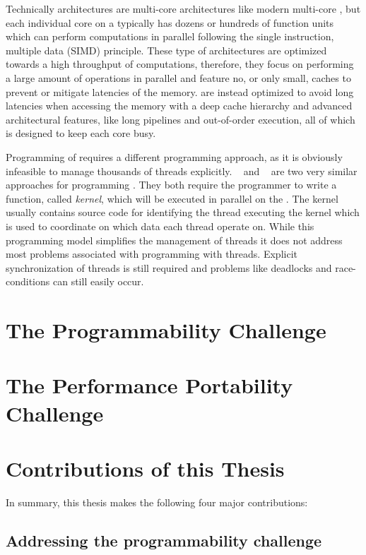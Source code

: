 Technically \GPU architectures are multi-core architectures like modern multi-core \CPUs, but each individual core on a \GPU typically has dozens or hundreds of function units which can perform computations in parallel following the single instruction, multiple data (SIMD) principle.
These type of architectures are optimized towards a high throughput of computations, therefore, they focus on performing a large amount of operations in parallel and feature no, or only small, caches to prevent or mitigate latencies of the memory.
\CPUs are instead optimized to avoid long latencies when accessing the memory with a deep cache hierarchy and advanced architectural features, like long pipelines and out-of-order execution, all of which is designed to keep each core busy.

Programming of \GPUs requires a different programming approach, as it is obviously infeasible to manage thousands of threads explicitly.
\CUDA~\cite{} and \OpenCL~\cite{} are two very similar approaches for programming \GPUs.
They both require the programmer to write a function, called \emph{kernel}, which will be executed in parallel on the \GPU.
The kernel usually contains source code for identifying the thread executing the kernel which is used to coordinate on which data each thread operate on.
While this programming model simplifies the management of threads it does not address most problems associated with programming with threads.
Explicit synchronization of threads is still required and problems like deadlocks and race-conditions can still easily occur.

\section{The Programmability Challenge}

\section{The Performance Portability Challenge}

\section{Contributions of this Thesis}

In summary, this thesis makes the following four major contributions:

\subsection*{Addressing the programmability challenge}

